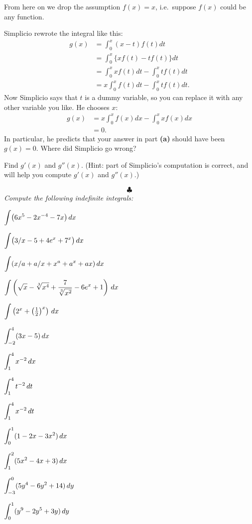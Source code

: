 \begin{multicols}{2}
From here on we drop the assumption $f(x) = x$, i.e.~suppose $f(x)$ could
be any function.  

\subprob Simplicio rewrote the integral like this:
\begin{align*}
  g(x) &= \int_0^x (x-t) f(t) dt\\
  &= \int_0^x \bigl\{xf(t) -tf(t)\bigr\} dt \\
  &=  \int_0^x xf(t)dt -\int_0^x tf(t) dt \\
  &=  x\int_0^x f(t)dt -\int_0^x tf(t) dt .
\end{align*}
Now Simplicio says that $t$ is a dummy variable, so you can replace it with any
other variable you like.  He chooses $x$:
\begin{align*}
  g(x) & =  x\int_0^x f(x)dx -\int_0^x xf(x) dx \\
  &=0.
\end{align*}
In particular, he predicts that your answer in part \textbf{(a)} should have
been $g(x) = 0$.  Where did Simplicio go wrong?

\subprob Find $g'(x)$ and $g''(x)$. (Hint: part of Simplicio's computation is
correct, and will help you compute $g'(x)$ and $g''(x)$.)


\[
\clubsuit
\]
\begingroup
\itshape Compute the following indefinite integrals:
\endgroup

\problem $\displaystyle \int \bigl(6x^5-2x^{-4}-7x\bigr)\,dx$ %

\problem $\displaystyle\int \bigl(3/x-5+4e^x+7^x\bigr) \,dx$ %

\problem $\displaystyle \int (x/a+a/x+x^a+a^x+ax) \,dx $ %

\problem $\DS\int \left(\sqrt{x}- \sqrt[3]{x^4}+\frac{7}{\sqrt[3]{x^2}} %
-6e^x+1\right) \,dx $

\problem $\displaystyle\int \left(2^x+\bigl(\tfrac12\bigr)^x\right) \,dx$ %

\problem $\displaystyle\int^4_{-2} (3x-5) \,dx$ %

\problem $\displaystyle \int^4_{1} x^{-2} \,dx$ %

\problem $\displaystyle \int^4_{1} t^{-2} \,dt$ %

\problem $\displaystyle \int^4_{1} x^{-2} \,dt$ %

\problem $\displaystyle \int^1_{0} (1-2x-3x^2) \,dx$ %

\problem $\displaystyle \int^2_1 (5x^2-4x+3) \,dx$ %

\problem $\displaystyle \int^0_{-3} (5y^4-6y^2+14) \,dy$ %

\problem $\displaystyle \int^1_{0} (y^9-2y^5+3y) \,dy$ %


\end{multicols}
